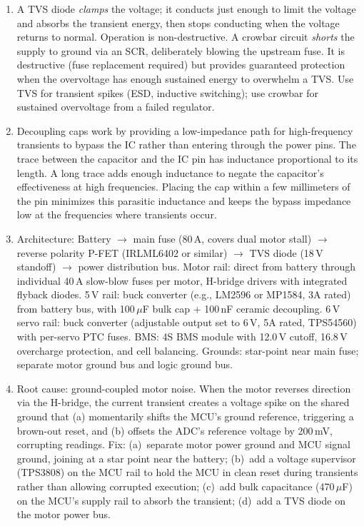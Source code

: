 \documentclass[11pt,letterpaper,twoside,openany]{book}
\begin{document}
\begin{enumerate}[leftmargin=1.5em]
  \item A TVS diode \emph{clamps} the voltage; it conducts just enough to limit the voltage and absorbs the transient energy, then stops conducting when the voltage returns to normal. Operation is non-destructive. A crowbar circuit \emph{shorts} the supply to ground via an SCR, deliberately blowing the upstream fuse. It is destructive (fuse replacement required) but provides guaranteed protection when the overvoltage has enough sustained energy to overwhelm a TVS. Use TVS for transient spikes (ESD, inductive switching); use crowbar for sustained overvoltage from a failed regulator.

  \item Decoupling caps work by providing a low-impedance path for high-frequency transients to bypass the IC rather than entering through the power pins. The trace between the capacitor and the IC pin has inductance proportional to its length. A long trace adds enough inductance to negate the capacitor's effectiveness at high frequencies. Placing the cap within a few millimeters of the pin minimizes this parasitic inductance and keeps the bypass impedance low at the frequencies where transients occur.

  \item Architecture: Battery $\to$ main fuse (80\,A, covers dual motor stall) $\to$ reverse polarity P-FET (IRLML6402 or similar) $\to$ TVS diode (18\,V standoff) $\to$ power distribution bus. Motor rail: direct from battery through individual 40\,A slow-blow fuses per motor, H-bridge drivers with integrated flyback diodes. 5\,V rail: buck converter (e.g., LM2596 or MP1584, 3A rated) from battery bus, with 100\,$\mu$F bulk cap + 100\,nF ceramic decoupling. 6\,V servo rail: buck converter (adjustable output set to 6\,V, 5A rated, TPS54560) with per-servo PTC fuses. BMS: 4S BMS module with 12.0\,V cutoff, 16.8\,V overcharge protection, and cell balancing. Grounds: star-point near main fuse; separate motor ground bus and logic ground bus.

  \item Root cause: ground-coupled motor noise. When the motor reverses direction via the H-bridge, the current transient creates a voltage spike on the shared ground that (a) momentarily shifts the MCU's ground reference, triggering a brown-out reset, and (b) offsets the ADC's reference voltage by 200\,mV, corrupting readings. Fix: (a)~separate motor power ground and MCU signal ground, joining at a star point near the battery; (b)~add a voltage supervisor (TPS3808) on the MCU rail to hold the MCU in clean reset during transients rather than allowing corrupted execution; (c)~add bulk capacitance (470\,$\mu$F) on the MCU's supply rail to absorb the transient; (d)~add a TVS diode on the motor power bus.


\end{enumerate}
\end{document}
